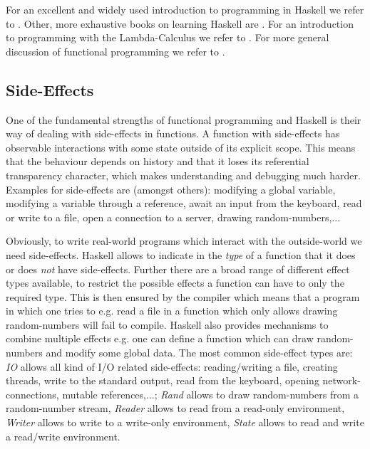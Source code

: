 For an excellent and widely used introduction to programming in Haskell we refer to \cite{hutton_programming_2016}. Other, more exhaustive books on learning Haskell are \cite{lipovaca_learn_2011, allen_haskell_2016}. For an introduction to programming with the Lambda-Calculus we refer to \cite{michaelson_introduction_2011}. For more general discussion of functional programming we refer to \cite{hughes_why_1989, maclennan_functional_1990, hudak_history_2007}.

\subsection{Side-Effects}
One of the fundamental strengths of functional programming and Haskell is their way of dealing with side-effects in functions. A function with side-effects has observable interactions with some state outside of its explicit scope. This means that the behaviour depends on history and that it loses its referential transparency character, which makes understanding and debugging much harder. Examples for side-effects are (amongst others): modifying a global variable, modifying a variable through a reference, await an input from the keyboard, read or write to a file, open a connection to a server, drawing random-numbers,...

Obviously, to write real-world programs which interact with the outside-world we need side-effects. Haskell allows to indicate in the \textit{type} of a function that it does or does \textit{not} have side-effects. Further there are a broad range of different effect types available, to restrict the possible effects a function can have to only the required type. This is then ensured by the compiler which means that a program in which one tries to e.g. read a file in a function which only allows drawing random-numbers will fail to compile. Haskell also provides mechanisms to combine multiple effects e.g. one can define a function which can draw random-numbers and modify some global data. The most common side-effect types are: \textit{IO} allows all kind of I/O related side-effects: reading/writing a file, creating threads, write to the standard output, read from the keyboard, opening network-connections, mutable references,...; \textit{Rand} allows to draw random-numbers from a random-number stream, \textit{Reader} allows to read from a read-only environment, \textit{Writer} allows to write to a write-only environment, \textit{State} allows to read and write a read/write environment.

